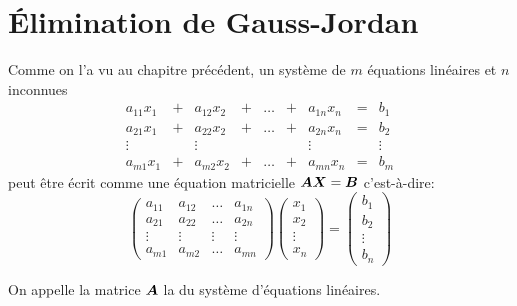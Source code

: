 \section{Élimination de Gauss-Jordan}
Comme on l'a vu au chapitre précédent, un système de $m$ équations linéaires
et $n$ inconnues
\begin{equation}
	\begin{matrix}
	a_{11}x_1 &+& a_{12}x_2 &+& \ldots &+& a_{1n}x_n &=& b_1 \\
	a_{21}x_1 &+& a_{22}x_2 &+& \ldots &+& a_{2n}x_n &=& b_2 \\
	\vdots && \vdots &&  && \vdots && \vdots \\
	a_{m1}x_1 &+& a_{m2}x_2 &+& \ldots &+& a_{mn}x_n &=& b_m
	\end{matrix}\label{systeme}
\end{equation}
peut être écrit comme une équation matricielle $\boldsymbol{A}\boldsymbol{X} = \boldsymbol{B}$
c'est-à-dire:
\[
\begin{pmatrix}
a_{11} & a_{12} & \ldots & a_{1n}\\
a_{21} & a_{22} & \ldots & a_{2n} \\
\vdots & \vdots & \vdots & \vdots \\
a_{m1} & a_{m2} & \ldots & a_{mn}
\end{pmatrix}
\begin{pmatrix}
x_1 \\ x_2 \\ \vdots \\ x_n
\end{pmatrix}
=
\begin{pmatrix}
b_1 \\ b_2 \\ \vdots \\ b_n
\end{pmatrix}
\]

On appelle la matrice $\boldsymbol{A}$ la  du système d'équations
linéaires.

